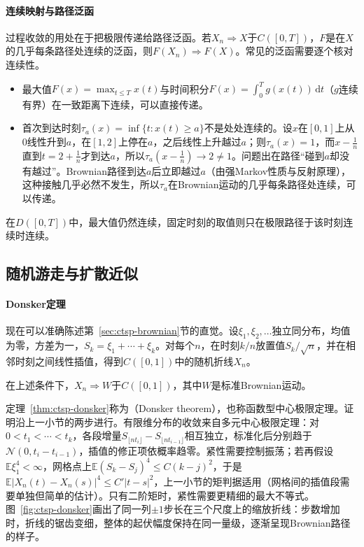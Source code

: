\paragraph{连续映射与路径泛函}
过程收敛的用处在于把极限传递给路径泛函。若$X_n\Rightarrow X$于$C([0,T])$，$F$是在$X$的几乎每条路径处连续的泛函，则$F(X_n)\Rightarrow F(X)$。常见的泛函需要逐个核对连续性。
\begin{itemize}
  \item 最大值$F(x)=\max_{t\leq T}x(t)$与时间积分$F(x)=\int_0^Tg(x(t))\,\mathrm dt$（$g$连续有界）在一致距离下连续，可以直接传递。
  \item 首次到达时刻$\tau_a(x)=\inf\{t:x(t)\geq a\}$不是处处连续的。设$x$在$[0,1]$上从$0$线性升到$a$，在$[1,2]$上停在$a$，之后线性上升越过$a$；则$\tau_a(x)=1$，而$x-\frac1n$直到$t=2+\frac1n$才到达$a$，所以$\tau_a(x-\frac1n)\to2\neq1$。问题出在路径“碰到$a$却没有越过”。Brownian路径到达$a$后立即越过$a$（由强Markov性质与反射原理），这种接触几乎必然不发生，所以$\tau_a$在Brownian运动的几乎每条路径处连续，可以传递。
\end{itemize}
在$D([0,T])$中，最大值仍然连续，固定时刻的取值则只在极限路径于该时刻连续时连续。

\subsection{随机游走与扩散近似}
\label{sec:ctsp-donsker}

\paragraph{Donsker定理}
现在可以准确陈述第~\ref{sec:ctsp-brownian}节的直觉。设$\xi_1,\xi_2,\ldots$独立同分布，均值为零，方差为一，$S_k=\xi_1+\cdots+\xi_k$。对每个$n$，在时刻$k/n$放置值$S_k/\sqrt n$，并在相邻时刻之间线性插值，得到$C([0,1])$中的随机折线$X_n$。

\begin{theorem}[Donsker定理]
  \label{thm:ctsp-donsker}
  在上述条件下，$X_n\Rightarrow W$于$C([0,1])$，其中$W$是标准Brownian运动。
\end{theorem}

定理~\ref{thm:ctsp-donsker}称为（Donsker theorem），也称函数型中心极限定理。证明沿上一小节的两步进行。有限维分布的收敛来自多元中心极限定理：对$0<t_1<\cdots<t_k$，各段增量$S_{\lfloor nt_i\rfloor}-S_{\lfloor nt_{i-1}\rfloor}$相互独立，标准化后分别趋于$\mathcal N(0,t_i-t_{i-1})$，插值的修正项依概率趋零。紧性需要控制振荡；若再假设$\mathbb E\xi_1^4<\infty$，网格点上$\mathbb E(S_k-S_j)^4\leq C(k-j)^2$，于是$\mathbb E|X_n(t)-X_n(s)|^4\leq C'|t-s|^2$，上一小节的矩判据适用（网格间的插值段需要单独但简单的估计）。只有二阶矩时，紧性需要更精细的最大不等式。图~\ref{fig:ctsp-donsker}画出了同一列$\pm1$步长在三个尺度上的缩放折线：步数增加时，折线的锯齿变细，整体的起伏幅度保持在同一量级，逐渐呈现Brownian路径的样子。

